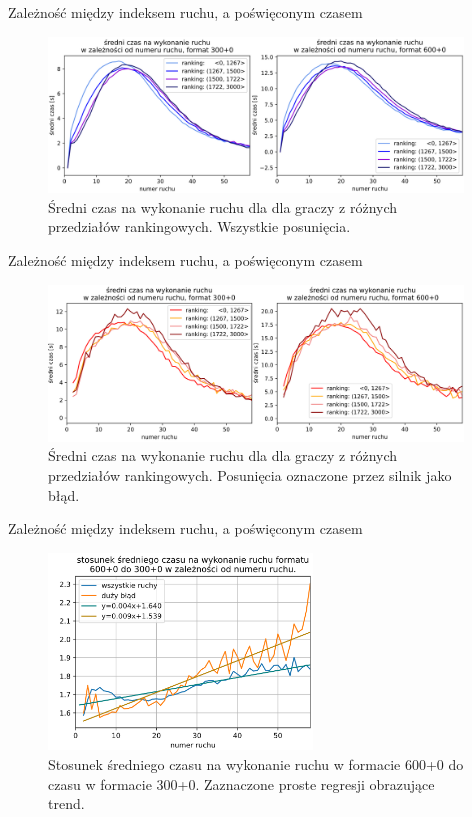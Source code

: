 \documentclass{beamer}
\begin{document}
\begin{frame}{Zależność między indeksem ruchu, a poświęconym czasem}
	\begin{figure}[H]
		\centering
		\includegraphics[width=11cm]{../Formatka/sr_czas_na_ruch_ELO_1.png}
		\caption{Średni czas na wykonanie ruchu dla dla graczy z różnych przedziałów rankingowych. Wszystkie posunięcia.}
		\label{rys:sr_czas_na_ruch_ELO_1}
	\end{figure}
\end{frame}

\begin{frame}{Zależność między indeksem ruchu, a poświęconym czasem}
	\begin{figure}[H]
		\centering
		\includegraphics[width=11cm]{../Formatka/sr_czas_na_ruch_ELO_2.png}
		\caption{Średni czas na wykonanie ruchu dla dla graczy z różnych przedziałów rankingowych. Posunięcia oznaczone przez silnik jako błąd.}
		\label{rys:sr_czas_na_ruch_ELO_2}
	\end{figure}
\end{frame}

\begin{frame}{Zależność między indeksem ruchu, a poświęconym czasem}
\begin{figure}[H]
	\centering
	\includegraphics[width=7cm]{../Formatka/stosunek_sr_czas.png}
	\caption{Stosunek średniego czasu na wykonanie ruchu w formacie 600+0 do czasu w formacie 300+0. Zaznaczone proste regresji obrazujące trend.}
	\label{rys:stosunek_sr_czas}
\end{figure}
\end{frame}
\end{document}
